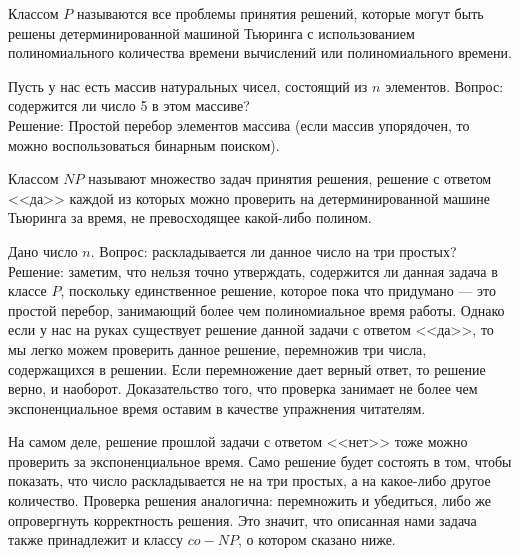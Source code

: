     \begin{Def} Классом $P$ называются все проблемы принятия решений,  которые могут быть решены детерминированной машиной Тьюринга с использованием         полиномиального количества времени вычислений или полиномиального времени.
    \end{Def}
    \begin{Example}
        Пусть у нас есть массив натуральных чисел, состоящий из $n$ элементов. Вопрос: содержится ли число 5 в этом массиве?\\
        Решение: Простой перебор элементов массива (если массив упорядочен, то можно воспользоваться бинарным поиском).
    \end{Example}
    \begin{Def}
        Классом $NP$ называют множество задач принятия решения, решение с ответом <<да>> каждой из которых можно проверить на детерминированной машине Тьюринга за время, не превосходящее какой-либо полином.
    \end{Def}
    \begin{Example} 
        Дано число $n$. Вопрос: раскладывается ли данное число на три простых?\\
        Решение: заметим, что нельзя точно утверждать, содержится ли данная задача в классе $P$, поскольку единственное решение, которое пока что придумано --- это простой перебор, занимающий более чем полиномиальное время работы. Однако если у нас на руках существует решение данной задачи с ответом <<да>>, то мы легко можем проверить данное решение, перемножив три числа, содержащихся в решении. Если перемножение дает верный ответ, то решение верно, и наоборот. Доказательство того, что проверка занимает не более чем экспоненциальное время оставим в качестве упражнения читателям.
    \end{Example}
    \begin{Rem}
        На самом деле, решение прошлой задачи с ответом <<нет>> тоже можно проверить за экспоненциальное время. Само решение будет состоять в том, чтобы показать, что число раскладывается не на три простых, а на какое-либо другое количество. Проверка решения аналогична: перемножить и убедиться, либо же опровергнуть корректность решения. Это значит, что описанная нами задача также принадлежит и классу $co-NP$, о котором сказано ниже.
    \end{Rem}
